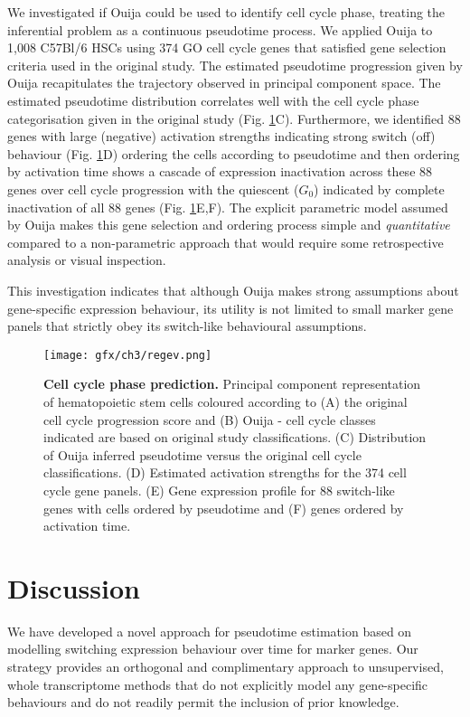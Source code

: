 We investigated if Ouija could be used to identify cell cycle phase, treating the inferential problem as a continuous pseudotime process. We applied Ouija to 1,008 C57Bl/6 HSCs using 374 GO cell cycle genes that satisfied gene selection criteria used in the original study. The estimated pseudotime progression given by Ouija recapitulates the  trajectory observed in principal component space. The estimated pseudotime distribution correlates well with the cell cycle phase categorisation  given in the original study (Fig. \ref{fig:regev}C). Furthermore, we identified 88 genes with large (negative) activation strengths indicating strong switch (off) behaviour (Fig. \ref{fig:regev}D) ordering the cells according to pseudotime and then ordering by activation time shows a cascade of expression inactivation across these 88 genes over cell cycle progression with the quiescent ($G_0$) indicated by complete inactivation of all 88 genes (Fig. \ref{fig:regev}E,F). The explicit parametric model assumed by Ouija makes this gene selection and ordering process simple and \emph{quantitative} compared to a non-parametric approach that would require some retrospective analysis or visual inspection.

This investigation indicates that although Ouija makes strong assumptions about gene-specific expression behaviour, its utility is not limited to small marker gene panels that strictly obey its switch-like behavioural assumptions.

\begin{figure}
	\texttt{[image: gfx/ch3/regev.png]}
	\caption{{\bf Cell cycle phase prediction.} Principal component representation of hematopoietic stem cells coloured according to (A) the original cell cycle progression score \cite{Kowalczyk2015-li} and (B) Ouija - cell cycle classes indicated are based on original study classifications. (C) Distribution of Ouija inferred pseudotime versus the original cell cycle classifications. (D) Estimated activation strengths for the 374 cell cycle gene panels. (E) Gene expression profile for 88 switch-like genes with cells ordered by pseudotime and (F) genes ordered by activation time.}
	\label{fig:regev}
\end{figure}




\section{Discussion}

We have developed a novel approach for pseudotime estimation based on modelling switching expression behaviour over time for marker genes. Our strategy provides an orthogonal and complimentary approach to unsupervised, whole transcriptome methods that do not explicitly model any gene-specific behaviours and do not readily permit the inclusion of prior knowledge.

